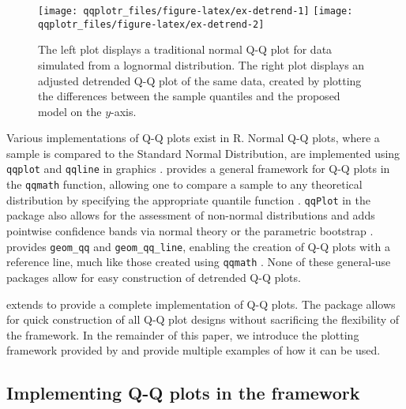 \begin{Schunk}
\begin{figure}

{\centering \texttt{[image: qqplotr\_files/figure-latex/ex-detrend-1]} \texttt{[image: qqplotr\_files/figure-latex/ex-detrend-2]} 

}

\caption[The left plot displays a traditional normal Q-Q plot for data simulated from a lognormal distribution]{The left plot displays a traditional normal Q-Q plot for data simulated from a lognormal distribution. The right plot displays an adjusted detrended Q-Q plot of the same data, created by plotting the differences between the sample quantiles and the proposed model on the $y$-axis.}\label{fig:ex-detrend}
\end{figure}
\end{Schunk}

Various implementations of Q-Q plots exist in R. Normal Q-Q plots, where
a sample is compared to the Standard Normal Distribution, are
implemented using \texttt{qqplot} and \texttt{qqline} in 
graphics \citep{R}.  provides a general framework for Q-Q
plots in the \texttt{qqmath} function, allowing one to compare a sample
to any theoretical distribution by specifying the appropriate quantile
function \citep{lattice}. \texttt{qqPlot} in the  package also
allows for the assessment of non-normal distributions and adds pointwise
confidence bands via normal theory or the parametric bootstrap
\citep{car}.  provides \texttt{geom\_qq} and
\texttt{geom\_qq\_line}, enabling the creation of Q-Q plots with a
reference line, much like those created using \texttt{qqmath}
\citep{ggplot2}. None of these general-use packages allow for easy
construction of detrended Q-Q plots.

 extends  to provide a complete implementation
of Q-Q plots. The package allows for quick construction of all Q-Q plot
designs without sacrificing the flexibility of the 
framework. In the remainder of this paper, we introduce the plotting
framework provided by  and provide multiple examples of how
it can be used.

\subsection{\texorpdfstring{Implementing Q-Q plots in the 
framework}{Implementing Q-Q plots in the  framework}}\label{implementing-q-q-plots-in-the-framework}

